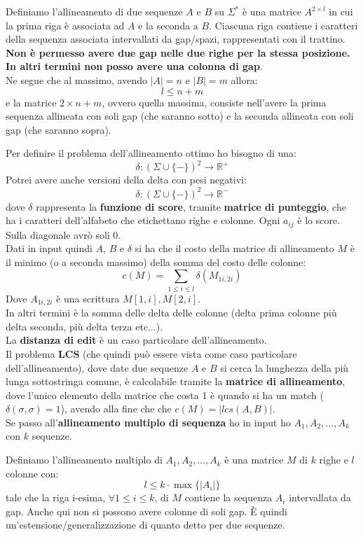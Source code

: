 \documentclass[a4paper,12pt, oneside]{book}
\begin{document}
\begin{definizione}
  Definiamo l'allineamento di due sequenze $A$ e $B$ su $\Sigma^*$ è una matrice
  $A^{2\times l}$ in cui la prima riga è associata ad $A$ e la seconda a
  $B$. Ciascuna riga contiene i caratteri della sequenza associata
  intervallati da gap/spazi, rappresentati con il trattino.\\
  \textbf{Non è permesso avere due gap nelle due righe per la stessa
    posizione. In altri termini non posso avere una colonna di gap}.\\
  Ne segue che al massimo, avendo $|A|=n$ e $|B|=m$ allora:
  \[l\leq n+m\]
  e la matrice $2\times n+m$, ovvero quella massima, consiste nell'avere la
  prima sequenza allineata con soli gap (che saranno sotto) e la seconda
  allineata con soli gap (che saranno sopra).
\end{definizione}
Per definire il problema dell'allineamento ottimo ho bisogno di una:
\[\delta:(\Sigma\cup\{-\})^2\to\mathbb{R}^+\]
Potrei avere anche versioni della delta con pesi negativi:
\[\delta:(\Sigma\cup\{-\})^2\to\mathbb{R}^-\]
dove $\delta$ rappresenta la \textbf{funzione di score}, tramite \textbf{matrice
  di punteggio}, che ha i caratteri 
dell'alfabeto che etichettano righe e colonne. Ogni $a_{ij}$ è lo score.
Sulla diagonale avrò soli 0.\\
Dati in input quindi $A$, $B$ e $\delta$ si ha che il costo della matrice di
allineamento $M$ è il minimo (o a seconda massimo) della somma del costo delle
colonne: 
\[c(M)=\sum_{1\leq i\leq l}\delta(M_{1i,2i})\]
Dove $A_{1i,2i}$ è una scrittura $M[1,i],M[2,i]$.\\
In altri termini è la somma delle delta delle colonne (delta prima colonne più
delta seconda, più delta terza etc$\ldots$).\\
La \textbf{distanza di edit} è un caso particolare dell'allineamento.\\
Il problema \textbf{LCS} (che quindi può essere vista come caso particolare
dell'allineamento), dove date due sequenze $A$ e $B$ si cerca la lunghezza 
della più lunga sottostringa comune, è calcolabile tramite la \textbf{matrice di
  allineamento}, dove l'unico elemento della matrice che costa 1 è quando si ha
un match ($\delta(\sigma,\sigma)=1$), avendo alla fine che che
$c(M)=|lcs(A,B)|$.  \\
Se passo all'\textbf{allineamento multiplo di sequenza} ho in input ho
$A_1,A_2,\ldots,A_k$ con $k$ sequenze. 
\begin{definizione}
  Definiamo l'allineamento multiplo di $A_1,A_2,\ldots,A_k$ è una matrice $M$
  di $k$ righe e $l$ colonne con:
  \[l\leq k\cdot \max\{|A_i|\}\]
  tale che la riga i-esima, $\forall 1\leq i\leq k$, di $M$ contiene la sequenza
  $A_i$ intervallata da gap. Anche qui non si possono avere colonne di soli
  gap. È quindi un'estensione/generalizzazione di quanto detto per due
  sequenze. 
\end{definizione}
\end{document}
